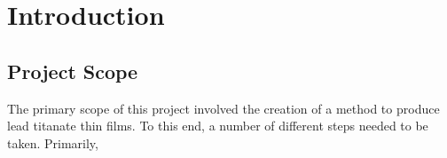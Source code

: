 \chapter{Introduction}
\label{ch:Intro}
\thispagestyle{empty}






\section{Project Scope}
\label{sec:Intro-Scope}

The primary scope of this project involved the creation of a method to produce lead titanate thin films. To this end, a number of different steps needed to be taken. Primarily, 





